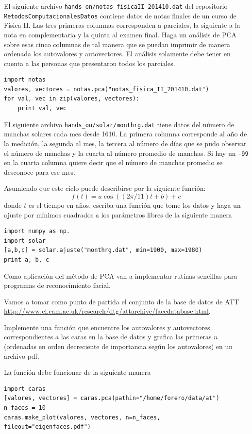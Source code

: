 \documentclass[11pt,letterpaper]{exam}
\begin{document}
\begin{questions}

 El siguiente archivo
\verb"hands_on/notas_fisicaII_201410.dat" del repositorio
\verb"MetodosComputacionalesDatos" contiene datos de notas finales de
un curso de F\'isica II. Las tres primeras columnas corresponden a
parciales, la siguiente a la nota en complementaria y la quinta al
examen final. Haga un an\'alisis de PCA sobre esas cinco columnas de
tal manera que se puedan imprimir de manera ordenada los autovalores y
autovectores. El an\'alisis solamente debe tener en cuenta a las
personas que presentaron todos los parciales.

\begin{verbatim}
import notas
valores, vectores = notas.pca("notas_fisica_II_201410.dat")
for val, vec in zip(valores, vectores):
    print val, vec
\end{verbatim}


El siguiente archivo \verb"hands_on/solar/monthrg.dat" tiene datos del
n\'umero de manchas solares cada mes desde 1610. La primera columna
corresponde al a\~no de la medici\'on, la segunda al mes, la tercera
al n\'umero de d\'ias que se pudo observar el n\'umero de manchas y la
cuarta al n\'umero promedio de manchas. Si hay un \verb"-99" en la
cuarta columna quiere decir que el n\'umero de manchas promedio se
desconoce para ese mes.

Asumiendo que este ciclo puede describirse por la siguiente funci\'on:
\begin{displaymath}
f(t) = a\cos((2\pi/11) t + b) + c
\end{displaymath}
donde $t$ es el tiempo en a\~nos, escriba una funci\'on que tome los
datos y haga un ajuste por m\'inimos cuadrados a los par\'ametros
libres de la siguiente manera

\begin{verbatim}
import numpy as np.
import solar
[a,b,c] = solar.ajuste("monthrg.dat", min=1900, max=1980)
print a, b, c
\end{verbatim}

Como aplicaci\'on del m\'etodo de PCA van a implementar rutinas
sencillas para programas de reconocimiento facial.

Vamos a tomar como punto de partida el conjunto de la base de datos de
ATT
\url{http://www.cl.cam.ac.uk/research/dtg/attarchive/facedatabase.html}. 

Implemente una funci\'on que encuentre los autovalores y autovectores
correspondientes a las caras en la base de datos y grafica las
primeras $n$ (ordenadas en orden decreciente de importancia seg\'un
los autovalores) en un archivo pdf. 

La funci\'on debe funcionar de la siguiente manera
\begin{verbatim}
import caras
[valores, vectores] = caras.pca(pathin="/home/forero/data/at")
n_faces = 10
caras.make_plot(valores, vectores, n=n_faces, fileout="eigenfaces.pdf")
\end{verbatim}

\end{questions}
\end{document}
